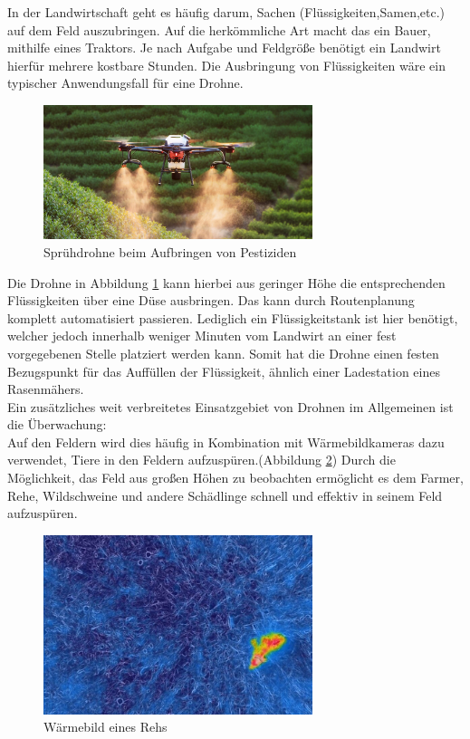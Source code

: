 In der Landwirtschaft geht es häufig darum, Sachen (Flüssigkeiten,Samen,etc.)
auf dem Feld auszubringen. Auf die herkömmliche Art macht das ein Bauer,
mithilfe eines Traktors. Je nach Aufgabe und Feldgröße benötigt ein Landwirt
hierfür mehrere kostbare Stunden. Die Ausbringung von Flüssigkeiten wäre ein
typischer Anwendungsfall für eine Drohne.

\begin{figure}[ht]
	\centering
	\includegraphics[width=0.7\textwidth]{bilder/drtohne.jpg}
	\caption[Sprühdrohne]{Sprühdrohne beim Aufbringen von Pestiziden \cite{Drohne}}
	\label{fig:sprühdrohne}
\end{figure}

Die Drohne in Abbildung \ref{fig:sprühdrohne} kann hierbei aus geringer Höhe
die entsprechenden Flüssigkeiten über eine Düse ausbringen. Das kann durch
Routenplanung komplett automatisiert passieren. Lediglich ein Flüssigkeitstank
ist hier benötigt, welcher jedoch innerhalb weniger Minuten vom Landwirt an
einer fest vorgegebenen Stelle platziert werden kann. Somit hat die Drohne
einen festen Bezugspunkt für das Auffüllen der Flüssigkeit, ähnlich einer
Ladestation eines Rasenmähers. \\ Ein zusätzliches weit verbreitetes
Einsatzgebiet von Drohnen im Allgemeinen ist die Überwachung: \\Auf den Feldern
wird dies häufig in Kombination mit Wärmebildkameras dazu verwendet, Tiere in
den Feldern aufzuspüren.(Abbildung \ref{fig:Wärmebild eines Rehs}) Durch die Möglichkeit,
das Feld aus großen Höhen zu beobachten ermöglicht es dem Farmer, Rehe,
Wildschweine und andere Schädlinge schnell und effektiv in seinem Feld
aufzuspüren.

\begin{figure}[ht]
	\centering
	\includegraphics[width=0.7\textwidth]{bilder/rteh.jpg}
	\caption[Wärmebild eines Rehs]{Wärmebild eines Rehs \cite{reh}}
	\label{fig:Wärmebild eines Rehs}
\end{figure}